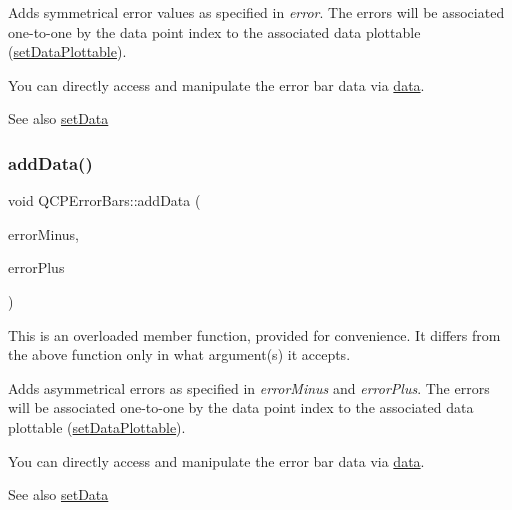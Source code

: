 Adds symmetrical error values as specified in {\itshape error}. The errors will be associated one-\/to-\/one by the data point index to the associated data plottable (\hyperlink{classQCPErrorBars_aabb42a964cfbf780cd1c79850c7cd989}{set\+Data\+Plottable}).

You can directly access and manipulate the error bar data via \hyperlink{classQCPErrorBars_aeebd1b14f4c3573565efafd514988813}{data}.

\begin{DoxySeeAlso}{See also}
\hyperlink{classQCPErrorBars_a92b1980003255f5f7c05407a4d92aabc}{set\+Data} 
\end{DoxySeeAlso}
\mbox{\label{classQCPErrorBars_a2135cf41d7925a3dcdadd4eb03fd3eb6}} 
\subsubsection{\texorpdfstring{add\+Data()}{addData()}\hspace{0.1cm}{\footnotesize\ttfamily [2/4]}}
{\footnotesize\ttfamily void Q\+C\+P\+Error\+Bars\+::add\+Data (\begin{DoxyParamCaption}\item[{const Q\+Vector$<$ double $>$ \&}]{error\+Minus,  }\item[{const Q\+Vector$<$ double $>$ \&}]{error\+Plus }\end{DoxyParamCaption})}

This is an overloaded member function, provided for convenience. It differs from the above function only in what argument(s) it accepts.

Adds asymmetrical errors as specified in {\itshape error\+Minus} and {\itshape error\+Plus}. The errors will be associated one-\/to-\/one by the data point index to the associated data plottable (\hyperlink{classQCPErrorBars_aabb42a964cfbf780cd1c79850c7cd989}{set\+Data\+Plottable}).

You can directly access and manipulate the error bar data via \hyperlink{classQCPErrorBars_aeebd1b14f4c3573565efafd514988813}{data}.

\begin{DoxySeeAlso}{See also}
\hyperlink{classQCPErrorBars_a92b1980003255f5f7c05407a4d92aabc}{set\+Data} 
\end{DoxySeeAlso}
\mbox{\label{classQCPErrorBars_a39ef73b0e61941fc4064fd3a5224c72a}} 
